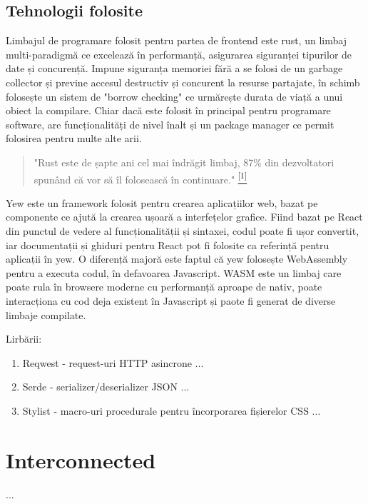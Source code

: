     \subsection{Tehnologii folosite}
    \label{Frontend-tehnologii}
    Limbajul de programare folosit pentru partea de frontend este rust, un limbaj multi-paradigmă ce excelează în performanță, asigurarea siguranței tipurilor de date și concurență. Impune siguranța memoriei fără a se folosi de un garbage collector și previne accesul destructiv și concurent la resurse partajate, în schimb folosește un sistem de "borrow checking" ce urmărește durata de viață a unui obiect la compilare. Chiar dacă este folosit în principal pentru programare software, are funcționalități de nivel înalt și un package manager ce permit folosirea pentru multe alte arii.

    \begin{quote}
        "Rust este de șapte ani cel mai îndrăgit limbaj, 87\% din dezvoltatori spunând că vor să îl folosească în continuare." \hyperref[stackoverflow-studiu-2022]{\textsuperscript{[1]}}
    \end{quote}

    Yew este un framework folosit pentru crearea aplicațiilor web, bazat pe componente ce ajută la crearea ușoară a interfețelor grafice. Fiind bazat pe React din punctul de vedere al funcționalității și sintaxei, codul poate fi ușor convertit, iar documentații și ghiduri pentru React pot fi folosite ca referință pentru aplicații în yew. O diferență majoră este faptul că yew folosește WebAssembly pentru a executa codul, în defavoarea Javascript. WASM este un limbaj care poate rula în browsere moderne cu performanță aproape de nativ, poate interacționa cu cod deja existent în Javascript și paote fi generat de diverse limbaje compilate.

    Lirbării:
    \begin{enumerate}[noitemsep]
        \item Reqwest - request-uri HTTP asincrone ...
        \item Serde - serializer/deserializer JSON ...
        \item Stylist - macro-uri procedurale pentru încorporarea fișierelor CSS ...
    \end{enumerate}
    
    \section{Interconnected}
    \label{Interconnected}
    ...
    
